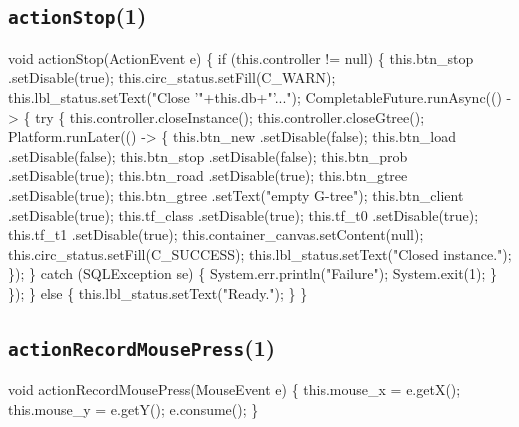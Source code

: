\subsection{\texttt{actionStop}(1)}
\nwenddocs{}\endmoddef{}
void actionStop(ActionEvent e) \{
  if (this.controller != null) \{
    this.btn_stop     .setDisable(true);
    this.circ_status.setFill(C_WARN);
    this.lbl_status.setText("Close '"+this.db+"'...");
    CompletableFuture.runAsync(() -> \{
      try \{
        this.controller.closeInstance();
        this.controller.closeGtree();
        Platform.runLater(() -> \{
          this.btn_new      .setDisable(false);
          this.btn_load     .setDisable(false);
          this.btn_stop     .setDisable(false);
          this.btn_prob     .setDisable(true);
          this.btn_road     .setDisable(true);
          this.btn_gtree    .setDisable(true);
          this.btn_gtree    .setText("empty G-tree");
          this.btn_client   .setDisable(true);
          this.tf_class     .setDisable(true);
          this.tf_t0        .setDisable(true);
          this.tf_t1        .setDisable(true);
          this.container_canvas.setContent(null);
          this.circ_status.setFill(C_SUCCESS);
          this.lbl_status.setText("Closed instance.");
        \});
      \} catch (SQLException se) \{
        System.err.println("Failure");
        System.exit(1);
      \}
    \});
  \} else \{
    this.lbl_status.setText("Ready.");
  \}
\}
\eatline
{}\nwendcode{}\nwdocspar
\subsection{\texttt{actionRecordMousePress}(1)}
\nwenddocs{}\endmoddef{}
void actionRecordMousePress(MouseEvent e) \{
  this.mouse_x = e.getX();
  this.mouse_y = e.getY();
  e.consume();
\}
\eatline
{}\nwendcode{}\nwdocspar
